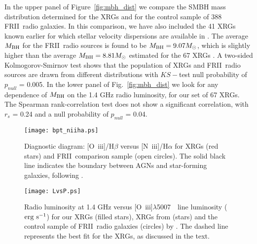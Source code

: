 \documentclass[twocolumn]{aastex62}
\def\frii{FR{II}~}
\def\o3o2{[O~{\sc iii}]/[O~{\sc ii}]}
\def\o3hb{[O~{\sc iii}]/H$\beta$}
\def\n2ha{[N~{\sc iii}]/H$\alpha$}
\def\oiii{[O~{\sc iii}]$\lambda$5007~}
\begin{document}
In the upper panel of Figure~\ref{fig:mbh_dist} we compare the SMBH
mass distribution determined for the XRGs and for the control sample
of 388 \frii radio galaxies. In this comparison, we have also included
the 41 XRGs  known earlier for which stellar velocity dispersions are available in
 \citet{Mezcua2011A&A...527A..38M,Mezcua2012A&A...544A..36M}. The
average $M_{\rm BH}$ for the \frii radio sources is found to be
$M_{\rm BH} = 9.07 M_\odot$, which is slightly higher than the average
$M_{\rm BH} = 8.81 M_\odot$ estimated for the 67 XRGs \citep[see
  also,][]{Kuzmicz2017MNRAS.471.3806K}. A two-sided Kolmogorov-Smirnov
test shows that the population of XRGs and \frii radio sources are
drawn from different distributions with $KS-$test null probability of
$p_{null}$ = 0.005. In the lower panel of Fig.~\ref{fig:mbh_dist} we
look for any dependence of $M_{\rm BH}$ on the 1.4 GHz radio
luminosity, for our set of 67 XRGs. The Spearman rank-correlation test
does not show a significant correlation, with $r_s$ = 0.24 and a null 
probability of $p_{null}$ = 0.04.




 \begin{figure}
  \centering
\texttt{[image: bpt\_niiha.ps]}
  \caption{Diagnostic diagram: \o3hb versus \n2ha for XRGs (red stars)
    and \frii comparison sample (open circles). The solid black line
    indicates the boundary between AGNs and star-forming galaxies,
    following \citet{Stasinska2006MNRAS.371..972S}.}
\label{fig:bpt}
 \end{figure}



 \begin{figure}
  \centering
\texttt{[image: LvsP.ps]}
  \caption{Radio luminosity at 1.4 GHz versus \oiii\ line luminosity
    ($\rm erg\ s^{-1}$) for our XRGs (filled stars), XRGs from
    \citet{Landt2010MNRAS.408.1103L} (stars) and the control sample of
    \frii radio galaxies (circles) by
    \citet{Koziel2011MNRAS.415.1013K}. The dashed line represents the
    best fit for the XRGs,  as discussed in the text.}
\label{fig:lvsp_dist}
 \end{figure}

 
\end{document}
